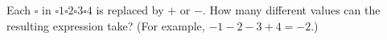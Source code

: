 Each $\square$ in $\square1\square2\square3\square4$ is replaced by $+$ or $-$. How many different values can the resulting expression take? (For example, $-1-2-3+4=-2$.)

